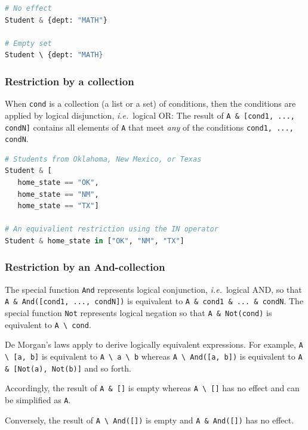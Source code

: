 \documentclass[letter,10pt]{article}
\begin{document}
\begin{lstlisting}[language=Python, caption={Restriction by a mapping with no matching keys}, label={lst:res-empty-map}]
# No effect 
Student & {dept: "MATH"}

# Empty set
Student \ {dept: "MATH}
\end{lstlisting}

\subsubsection{Restriction by a collection}
When \lstinline$cond$ is a collection (a list or a set) of conditions, then the conditions are applied by logical disjunction, \emph{i.e.}\ logical {OR}:
The result of \lstinline$A & [cond1, ..., condN]$ contains all elements of \lstinline$A$ that meet \emph{any} of the conditions \lstinline$cond1, ..., condN$.

\begin{lstlisting}[language=Python, caption={Restrictions by a collection of conditions.}, label={lst:res-list}]
# Students from Oklahoma, New Mexico, or Texas
Student & [
   home_state == "OK", 
   home_state == "NM", 
   home_state == "TX"] 

# An equivalient restriction using the IN operator
Student & home_state in ["OK", "NM", "TX"]
\end{lstlisting}

\subsubsection{Restriction by an And-collection}
The special function \lstinline$And$ represents logical conjunction, \emph{i.e.}\ logical {AND}, so that \lstinline$A & And([cond1, ..., condN])$ is equivalent to \lstinline$A & cond1 & ... & condN$.
The special function \lstinline$Not$ represents logical negation so that \lstinline$A & Not(cond)$ is equivalent to \lstinline$A \ cond$.

De Morgan's laws apply to derive logically equivalent expressions.  
For example, \lstinline$A \ [a, b]$ is equivalent to \lstinline$A \ a \ b$ whereas \lstinline$A \ And([a, b])$ is equivalent to \lstinline$A & [Not(a), Not(b)]$ and so forth.

Accordingly, the result of \lstinline$A & []$ is empty whereas \lstinline$A \ []$ has no effect and can be simplified as \lstinline$A$.

Conversely, the result of \lstinline$A \ And([])$ is empty and \lstinline$A & And([])$ has no effect.
\end{document}
